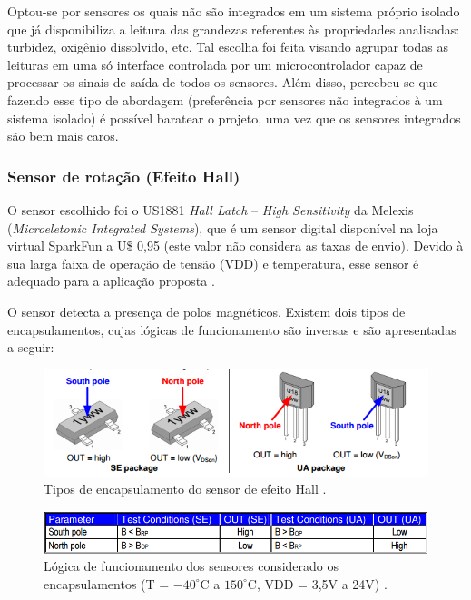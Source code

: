 Optou-se por sensores os quais não são integrados em um sistema próprio isolado que já disponibiliza a leitura das grandezas
      referentes às propriedades analisadas: turbidez, oxigênio dissolvido, etc. Tal escolha foi feita visando agrupar todas as
      leituras em uma só interface controlada por um microcontrolador capaz de processar os sinais de saída de todos os sensores.
      Além disso, percebeu-se que fazendo esse tipo de abordagem (preferência por sensores não integrados à um sistema isolado)
      é possível baratear o projeto, uma vez que os sensores integrados são bem mais caros.
      
      \subsubsection{Sensor de rotação (Efeito Hall)}
	
	O sensor escolhido foi o US1881 \textit{Hall Latch} – \textit{High Sensitivity} da Melexis
	(\textit{Microeletonic Integrated Systems}), que é um sensor
	digital disponível na loja virtual SparkFun a U\$ 0,95 (este valor não considera as taxas de envio). Devido à sua larga
	faixa de operação de tensão (VDD) e temperatura, esse sensor é adequado para a aplicação proposta \cite{melexis}.
	
	O sensor detecta a presença de polos magnéticos. Existem dois tipos de encapsulamentos, cujas lógicas de funcionamento
	são inversas e são apresentadas a seguir:
	
	\begin{figure}[!htbp]
	  \centering
	  \includegraphics[scale=0.4]{editaveis/figuras/encapsulamento_sensor_efeito_hall}
	  \caption[Tipos de encapsulamento do sensor de efeito Hall]{Tipos de encapsulamento do sensor de efeito Hall \cite{melexis}.}
	  \label{encapsulamento_sensor_efeito_hall}
	\end{figure}
	
	\begin{figure}[!htbp]
	  \centering
	  \includegraphics[scale=0.5]{editaveis/figuras/funcionamento_sensores_encapsulamento}
	  \caption[Lógica de funcionamento dos sensores considerado os encapsulamentos]
	  {Lógica de funcionamento dos sensores considerado os encapsulamentos (T = $-40^\circ\mathrm{C}$ a $150^\circ\mathrm{C}$, VDD = 3,5V a 24V) \cite{melexis}.}
	  \label{funcionamento_sensores_encapsulamento}
	\end{figure}
	
